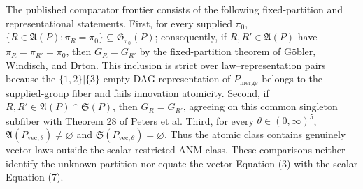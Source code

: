 The published comparator frontier consists of the following fixed-partition and representational statements. First, for every supplied \(\pi_0\), \(\{R\in\mathfrak A(P):\pi_R=\pi_0\}\subseteq\mathfrak G_{\pi_0}(P)\); consequently, if \(R,R'\in\mathfrak A(P)\) have \(\pi_R=\pi_{R'}=\pi_0\), then \(G_R=G_{R'}\) by the fixed-partition theorem of Göbler, Windisch, and Drton. This inclusion is strict over law--representation pairs because the \(\{1,2\}|\{3\}\) empty-DAG representation of \(P_{\mathrm{merge}}\) belongs to the supplied-group fiber and fails innovation atomicity. Second, if \(R,R'\in\mathfrak A(P)\cap\mathfrak S(P)\), then \(G_R=G_{R'}\), agreeing on this common singleton subfiber with Theorem 28 of Peters et al. Third, for every \(\theta\in(0,\infty)^5\), \(\mathfrak A(P_{\mathrm{vec},\theta})\neq\varnothing\) and \(\mathfrak S(P_{\mathrm{vec},\theta})=\varnothing\). Thus the atomic class contains genuinely vector laws outside the scalar restricted-ANM class. These comparisons neither identify the unknown partition nor equate the vector Equation (3) with the scalar Equation (7).